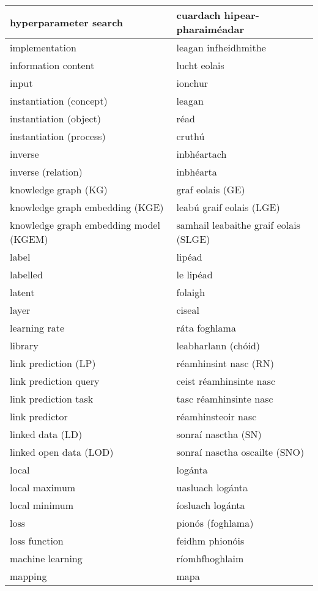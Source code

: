 \documentclass{article}
\begin{document}
\begin{longtable}{|l|l|}
		hyperparameter search&cuardach hipear-pharaiméadar\\ \hline 
		implementation&leagan infheidhmithe\\ \hline 
		information content&lucht eolais\\ \hline 
		input&ionchur\\ \hline 
		instantiation (concept)&leagan\\ \hline 
		instantiation (object)&réad\\ \hline 
		instantiation (process)&cruthú\\ \hline 
		inverse&inbhéartach\\ \hline 
		inverse (relation)&inbhéarta\\ \hline 
		knowledge graph (KG)&graf eolais (GE)\\ \hline 
		knowledge graph embedding (KGE)&leabú graif eolais (LGE)\\ \hline 
		knowledge graph embedding model (KGEM)&samhail leabaithe graif eolais (SLGE)\\ \hline 
		label&lipéad\\ \hline 
		labelled&le lipéad\\ \hline 
		latent&folaigh\\ \hline 
		layer&ciseal\\ \hline 
		learning rate&ráta foghlama\\ \hline 
		library&leabharlann (chóid)\\ \hline 
		link prediction (LP)&réamhinsint nasc (RN)\\ \hline 
		link prediction query&ceist réamhinsinte nasc\\ \hline 
		link prediction task&tasc réamhinsinte nasc\\ \hline 
		link predictor&réamhinsteoir nasc\\ \hline 
		linked data (LD)&sonraí nasctha (SN)\\ \hline 
		linked open data (LOD)&sonraí nasctha oscailte (SNO)\\ \hline 
		local&logánta\\ \hline 
		local maximum&uasluach logánta\\ \hline 
		local minimum&íosluach logánta\\ \hline 
		loss&pionós (foghlama)\\ \hline 
		loss function&feidhm phionóis\\ \hline 
		machine learning&ríomhfhoghlaim\\ \hline 
		mapping&mapa\\ \hline 

\end{longtable}
\end{document}
